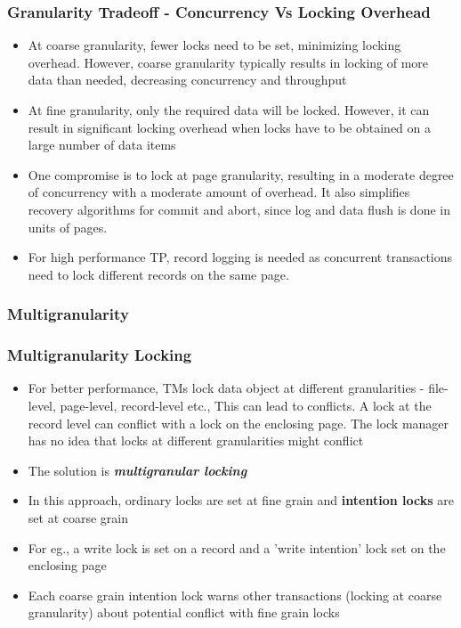 \documentclass[12]{beamer}
\begin{document}
\begin{frame}
  \frametitle{Granularity Tradeoff - Concurrency Vs Locking Overhead}
  \begin{itemize}
    \item At coarse granularity, fewer locks need to be set, minimizing locking overhead. However, coarse granularity typically results in locking of more data than needed, decreasing concurrency and throughput
    \item At fine granularity, only the required data will be locked. However, it can result in significant locking overhead when locks have to be obtained on a large number of data items
    \item One compromise is to lock at page granularity, resulting in a moderate degree of concurrency with a moderate amount of overhead.  It also simplifies recovery algorithms for commit and abort, since log and data flush is done in units of pages.
    \item For high performance TP, record logging is needed as concurrent transactions need to lock different records on the same page.
  \end{itemize}
\end{frame}

\subsubsection{Multigranularity}

\begin{frame}
  \frametitle{Multigranularity Locking}
  \begin{itemize}
    \item For better performance, TMs lock data object at different granularities - file-level, page-level, record-level etc., This can lead to conflicts. A lock at the record level can conflict with a lock on the enclosing page. The lock manager has no idea that locks at different granularities might conflict
    \item The solution is \textbf{\textit{multigranular locking}}
    \item In this approach, ordinary locks are set at fine grain and \textbf{intention locks} are set at coarse grain
    \item For eg., a write lock is set on a record and a 'write intention' lock set on the enclosing page
    \item Each coarse grain intention lock warns other transactions (locking at coarse granularity) about potential conflict with fine grain locks
  \end{itemize}
\end{frame}
\end{document}

